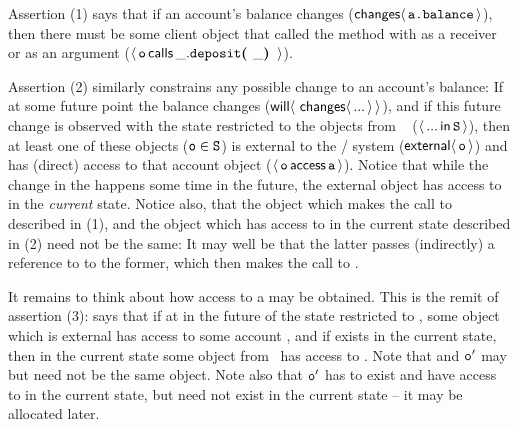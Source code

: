  
Assertion (1) %
says that if   an account's balance changes
($\Changes{\prg{a.balance}}$),
then there must be some client object 
that %
called the  method with  as a receiver or as an argument 
($\Calls{\prg{o}} {\prg{deposit}} {\_} {\_}$).
 
Assertion (2) similarly constrains any possible change to an 
account's balance: 
If at some future point the balance changes  (${\Future{\,\Changes{...}}}$),  %
and if this future change is observed with the state restricted to the objects from \SF~ (\ie $\Using{...}{\prg{S}}$), then 
at least one of these objects ($\prg{o}\in\SF$) is external to the / system ($\External{\prg{o}}$) and 
has (direct) access to that account object
($\CanAccess{\prg{o}}{\prg{a}}$).
Notice that while the change in the  happens some time in the future,
the external object  has access to  in the \emph{current} state.
Notice also, that the object which makes the call to  described in (1), and the object which 
has access to  in the current state described in (2) need not be the same: It may well be that the
latter passes (indirectly) a reference to  to the former, which then   makes the call
to .

It remains to think about how access to a  may be obtained. This is the remit of assertion (3): 
 says that if at  in the future of the state restricted to \SF, 
some object  which is external has access to some account , and if  exists in the 
current state, then in the current state some object 
from \SF~has access to . Note that  and $\prg{o}'$ may but need not be the same object. Note also
that $\prg{o}'$ has to exist and have access to  in the current state, but 
 need not exist in the current state -- it may be allocated later.

\vspace{.1cm}

